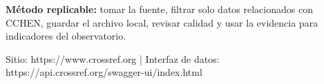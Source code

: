\documentclass[9pt,a4paper]{extarticle}
\begin{document}
\vspace{0.06cm}
\begin{tcolorbox}[enhanced,colback=white,colframe=cchenpurple!55,boxrule=0.45pt,arc=2pt,left=6pt,right=6pt,top=5pt,bottom=5pt]
{\bfseries\color{cchenpurple}Método replicable:} tomar la fuente, filtrar solo datos relacionados con CCHEN, guardar el archivo local, revisar calidad y usar la evidencia para indicadores del observatorio.
\end{tcolorbox}

\vspace{0.02cm}
{\scriptsize\color{mutedgray}Sitio: https://www.crossref.org \quad | \quad Interfaz de datos: https://api.crossref.org/swagger-ui/index.html}
\end{document}
